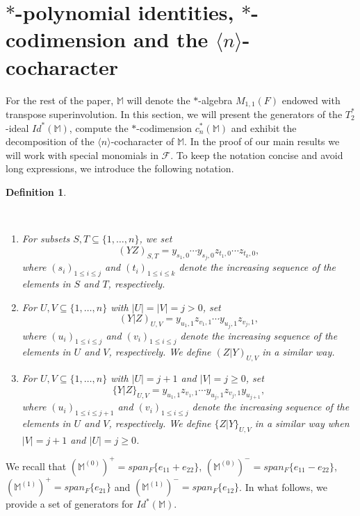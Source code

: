 \documentclass[10pt,a4paper]{amsart}
\newtheorem{definition}[theorem]{Definition}
\begin{document}
	
	
	
	
	
	
	
	
	\section{$*$-polynomial identities, $*$-codimension and the $\langle n \rangle$-cocharacter}
	For the rest of the paper, $\mathbb M$ will denote the $*$-algebra $M_{1,1}(F)$ endowed with transpose superinvolution. In this section, we will present the generators of the $T_2^*$-ideal $Id^*(\mathbb M)$, compute the $*$-codimension $c_n^*(\mathbb M)$ and exhibit the decomposition of the $\langle n\rangle$-cocharacter of $\mathbb M$. In the proof of our main results we will work with special monomials in $\mathcal F$. To keep the notation concise and avoid long expressions, we introduce the following notation.
    
	\begin{definition}\label{def:basic}

    \
    
		\begin{enumerate}
		    \item For subsets $S, T\subseteq \{1, \ldots, n\}$, we set $$(YZ)_{S, T}=y_{s_1, 0}\cdots y_{s_j, 0}z_{t_1, 0}\cdots z_{t_k, 0},$$ 
		where $(s_i)_{1\le i\le j}$ and $(t_i)_{1\le i\le k}$ denote the increasing sequence of the elements in $S$ and $T$, respectively. 

        \item For $U, V\subseteq \{1, \ldots, n\}$ with $|U|=|V|=j>0$, set 
		$$(Y|Z)_{U, V}=y_{u_1, 1}z_{v_1, 1}\cdots y_{u_j, 1}z_{v_j, 1},$$
		where $(u_i)_{1\le i\le j}$ and $(v_i)_{1\le i\le j}$ denote the increasing sequence of the elements in $U$ and $V$, respectively. We define $(Z|Y)_{U, V}$ in a similar way.

        \item For $U, V\subseteq \{1, \ldots, n\}$ with $|U|=j+1$ and $|V|=j\ge 0$, set 
		$$\{Y|Z\}_{U, V}=y_{u_1, 1}z_{v_1, 1}\cdots y_{u_j, 1}z_{v_j, 1}y_{u_{j+1}},$$
		where $(u_i)_{1\le i\le j+1}$ and $(v_i)_{1\le i\le j}$ denote the increasing sequence of the elements in $U$ and $V$, respectively. We define $\{Z|Y\}_{U, V}$ in a similar way when $|V|=j+1$ and $|U|=j\ge 0$.
		\end{enumerate}
	\end{definition}
	
	We recall that $(\mathbb M^{(0)})^+=span_F\{e_{11}+e_{22}\}$, $(\mathbb M^{(0)})^-=span_F\{e_{11}-e_{22}\}$, $(\mathbb M^{(1)})^+=span_F\{e_{21}\}$ and $(\mathbb M^{(1)})^-=span_F\{e_{12}\}$. In what follows, we provide a set of generators for $Id^*(\mathbb M)$. 
	
\end{document}
